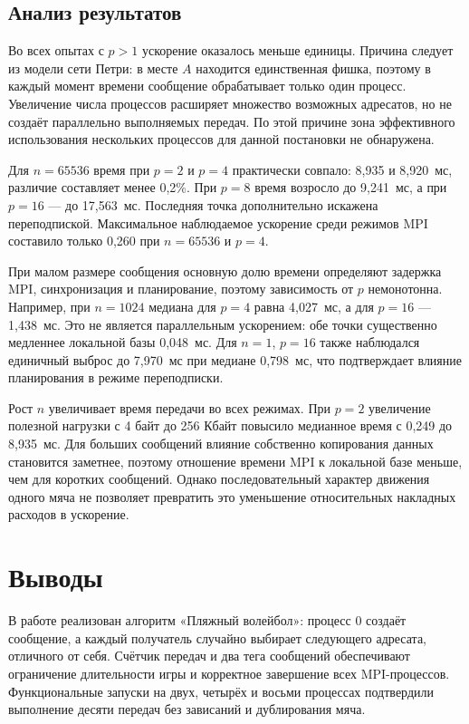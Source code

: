 \documentclass[14pt,a4paper]{extarticle}
\begin{document}
\subsection{Анализ результатов}

Во всех опытах с $p>1$ ускорение оказалось меньше единицы. Причина следует
из модели сети Петри: в месте $A$ находится единственная фишка, поэтому в
каждый момент времени сообщение обрабатывает только один процесс. Увеличение
числа процессов расширяет множество возможных адресатов, но не создаёт
параллельно выполняемых передач. По этой причине зона эффективного
использования нескольких процессов для данной постановки не обнаружена.

Для $n=65536$ время при $p=2$ и $p=4$ практически совпало: 8,935 и
8,920~мс, различие составляет менее 0,2\%. При $p=8$ время возросло до
9,241~мс, а при $p=16$ --- до 17,563~мс. Последняя точка дополнительно
искажена переподпиской. Максимальное наблюдаемое ускорение среди режимов MPI
составило только 0,260 при $n=65536$ и $p=4$.

При малом размере сообщения основную долю времени определяют задержка MPI,
синхронизация и планирование, поэтому зависимость от $p$ немонотонна.
Например, при $n=1024$ медиана для $p=4$ равна 4,027~мс, а для
$p=16$ --- 1,438~мс. Это не является параллельным ускорением: обе точки
существенно медленнее локальной базы 0,048~мс. Для $n=1$, $p=16$ также
наблюдался единичный выброс до 7,970~мс при медиане 0,798~мс, что подтверждает
влияние планирования в режиме переподписки.

Рост $n$ увеличивает время передачи во всех режимах. При $p=2$ увеличение
полезной нагрузки с 4 байт до 256 Кбайт повысило медианное время с 0,249 до
8,935~мс. Для больших сообщений влияние собственно копирования данных
становится заметнее, поэтому отношение времени MPI к локальной базе меньше,
чем для коротких сообщений. Однако последовательный характер движения одного
мяча не позволяет превратить это уменьшение относительных накладных расходов
в ускорение.

\section{Выводы}

В работе реализован алгоритм «Пляжный волейбол»: процесс 0 создаёт сообщение,
а каждый получатель случайно выбирает следующего адресата, отличного от себя.
Счётчик передач и два тега сообщений обеспечивают ограничение длительности
игры и корректное завершение всех MPI-процессов. Функциональные запуски на
двух, четырёх и восьми процессах подтвердили выполнение десяти передач без
зависаний и дублирования мяча.
\end{document}
